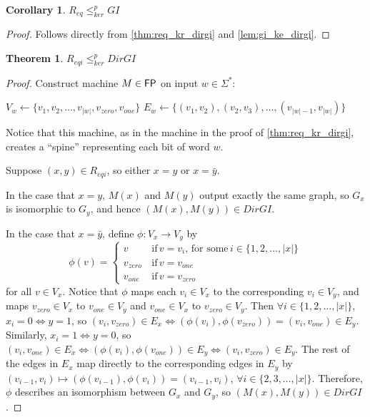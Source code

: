 \documentclass{article}
\newtheorem{theorem}{Theorem}%
\newtheorem{corollary}{Corollary}%
\theoremstyle{definition}
\newcommand{\plain}[1]{\,\text{#1}\,} %
\newcommand{\sigmastar}{\Sigma^{*}}
\newcommand{\kr}{\leq^{p}_{ker}} %
\begin{document}
\begin{corollary}$R_{eq}\kr GI$\end{corollary}
\begin{proof}Follows directly from \autoref{thm:req_kr_dirgi} and
  \autoref{lem:gi_ke_dirgi}.\end{proof}

\begin{theorem}\label{thm:reqi_kr_dirgi}$R_{eqi}\kr DirGI$\end{theorem}
\begin{proof}
  Construct machine $M\in {\ensuremath{\mathsf{FP}}}$ on input $w\in\sigmastar$:\\
  \begin{algorithm}[H]
    $V_w\gets\{v_1, v_2, \ldots, v_{|w|}, v_{zero}, v_{one}\}$\;
    $E_w\gets\{(v_1, v_2), (v_2, v_3), \ldots, (v_{|w|-1},
    v_{|w|})\}$\;
  \end{algorithm}
  Notice that this machine, as in the machine in the proof of
  \autoref{thm:req_kr_dirgi}, creates a ``spine'' representing each bit of word
  $w$.

  Suppose $(x, y)\in R_{eqi}$, so either $x=y$ or $x=\bar{y}$.

  In the case that $x=y$, $M(x)$ and $M(y)$ output exactly the same graph, so
  $G_x$ is isomorphic to $G_y$, and hence $(M(x), M(y))\in DirGI$.

  In the case that $x=\bar{y}$, define $\phi:V_x\to V_y$ by
  \begin{displaymath}
    \phi(v)=
    \begin{cases}
      v & \plain{if} v = v_i, \plain{for some} i\in\{1, 2, \ldots, |x|\}\\
      v_{zero} & \plain{if} v = v_{one}\\
      v_{one} & \plain{if} v = v_{zero}
    \end{cases}
  \end{displaymath}
  for all $v\in V_x$. Notice that $\phi$ maps each $v_i\in V_x$ to the
  corresponding $v_i\in V_y$, and maps $v_{zero}\in V_x$ to $v_{one}\in V_y$
  and $v_{one}\in V_x$ to $v_{zero}\in V_y$. Then $\forall
  i\in\{1,2,\ldots,|x|\}$, $x_i=0 \iff y=1$, so $(v_i, v_{zero})\in E_x \iff
  (\phi(v_i), \phi(v_{zero})) = (v_i, v_{one})\in E_y$. Similarly, $x_i=1 \iff
  y=0$, so $(v_i, v_{one})\in E_x \iff (\phi(v_i), \phi(v_{one}))\in E_y \iff
  (v_i, v_{zero})\in E_y$. The rest of the edges in $E_x$ map directly to the
  corresponding edges in $E_y$ by $(v_{i-1}, v_i) \mapsto (\phi(v_{i-1}),
  \phi(v_i))=(v_{i-1}, v_i)$, $\forall i\in\{2,3,\ldots,|x|\}$. Therefore,
  $\phi$ describes an isomorphism between $G_x$ and $G_y$, so $(M(x), M(y))\in
  DirGI$.


\end{proof}
\end{document}
